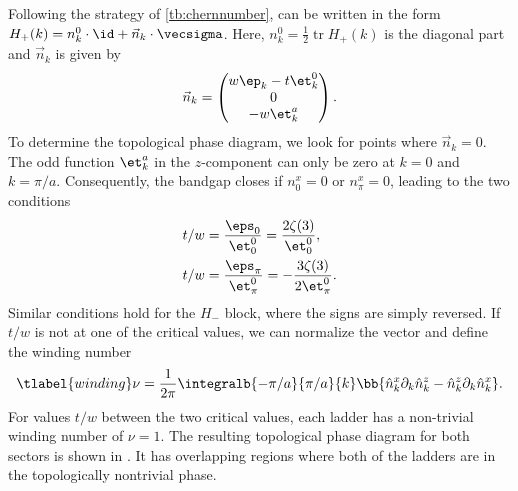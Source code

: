 Following the strategy of \cref{tb:chernnumber},  can be written in the form $H_+(k) = n^0_k \cdot \id + \vec{n}_k \cdot \vecsigma$. Here, $n^0_k = \frac{1}{2} \operatorname{tr} H_+(k)$ is the diagonal part and $\vec{n}_k$ is given by
\begin{align}
    \vec{n}_k = \begin{pmatrix}
        w \ep_k - t \et^0_k \\
        0 \\
        -w \et^a_k
    \end{pmatrix}.
\end{align}
To determine the topological phase diagram, we look for points where $\vec{n}_k=0$.
The odd function $\et^a_k$ in the $z$-component can only be zero at $k = 0$ and $k=\pi/a$.
Consequently, the bandgap closes if $n^x_0 = 0$ or $n^x_{\pi} = 0$, leading to the two conditions
\begin{align}
    t/w  &= \frac{\eps_0}{\et^0_0} = \frac{2\zeta(3)}{\et^0_0}, \\
    t/w  &= \frac{\eps_{\pi}}{\et^0_{\pi}} = - \frac{3 \zeta(3)}{2 \et^0_{\pi}}.
\end{align}
Similar conditions hold for the $H_-$ block, where the signs are simply reversed.
If $t/w$ is not at one of the critical values, we can normalize the vector and define the winding number
\begin{align} \tlabel{winding}
    \nu = \frac{1}{2\pi} \integralb{-\pi/a}{\pi/a}{k} \bb{ \hat{n}^x_k \partial_k \hat{n}^z_k - \hat{n}^z_k \partial_k \hat{n}^x_k }.
\end{align}
For values $t/w$ between the two critical values, each ladder has a non-trivial winding number of $\nu = 1$.
The resulting topological phase diagram for both sectors is shown in .
It has overlapping regions where both of the ladders are in the topologically nontrivial phase.


